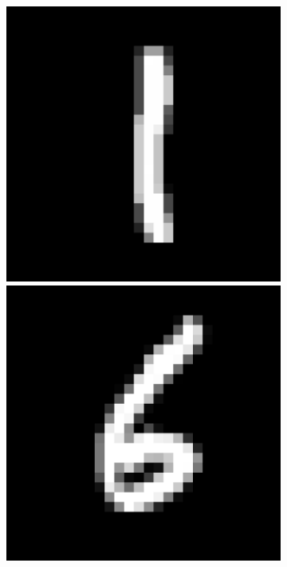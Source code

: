 \begin{figure}[H]
\begin{subfigure}[b]{2cm}
    \vspace{0.15cm}
    \end{subfigure}%
    \hspace{0.0075\textwidth}
    \begin{subfigure}[b]{2cm}
    \includegraphics[width =\textwidth]{figs/MNIST/mnist_1.pdf}
    \vspace{-1.07\baselineskip}\\[1ex]
    \includegraphics[width =\textwidth]{figs/MNIST/mnist_6.pdf}

\end{subfigure}
\end{figure}
